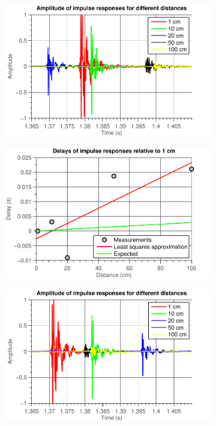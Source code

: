 \documentclass[11pt,titlepage]{report}
\begin{document}
\begin{figure}[H]
	\centering
	\begin{subfigure}{0.49\textwidth}
		\includegraphics[width=\textwidth]{../../deliverable-7-resources/figures/ass-1/report-11-12-13/ass-1-report-13-time.pdf}
	\end{subfigure}
	\begin{subfigure}{0.49\textwidth}
		\includegraphics[width=\textwidth]{../../deliverable-7-resources/figures/ass-1/report-11-12-13/ass-1-report-13-delays.pdf}
	\end{subfigure}
	\begin{subfigure}{0.49\textwidth}
		\includegraphics[width=\textwidth]{../../deliverable-7-resources/figures/ass-1/report-11-12-13/ass-1-report-13-time-set-2.pdf}

\end{subfigure}
\end{figure}
\end{document}
